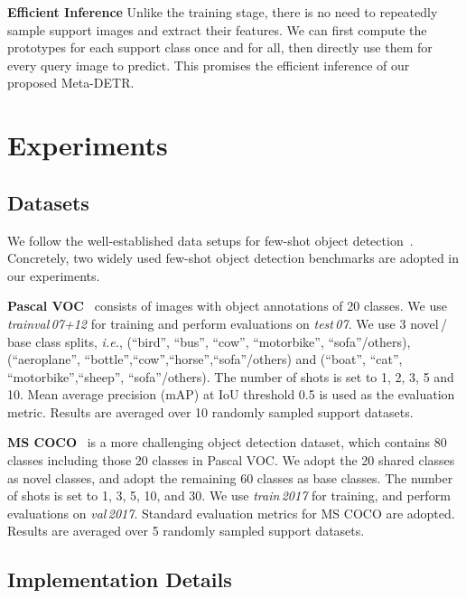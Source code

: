 \documentclass[letterpaper]{article} \usepackage{aaai22}  \usepackage{times}  \usepackage{helvet}  \usepackage{courier}  \usepackage[hyphens]{url}  \usepackage{graphicx} \urlstyle{rm} \def\UrlFont{\rm}  \usepackage{natbib}  \usepackage{caption} \DeclareCaptionStyle{ruled}{labelfont=normalfont,labelsep=colon,strut=off} \frenchspacing  \setlength{\pdfpagewidth}{8.5in}  \setlength{\pdfpageheight}{11in}  \usepackage{algorithm}
\begin{document}
\smallskip
\noindent\textbf{Efficient Inference\;\;}
Unlike the training stage, there is no need to repeatedly sample support images and extract their features. We can first compute the prototypes for each support class once and for all, then directly use them for every query image to predict. This promises the efficient inference of our proposed Meta-DETR.



\vspace{-1.50mm}
\section{Experiments}

\subsection{Datasets}

We follow the well-established data setups for few-shot object detection~\cite{FewshotReweighting,fsdet}. Concretely, two widely used few-shot object detection benchmarks are adopted in our experiments.

\smallskip
\noindent
\textbf{Pascal VOC}~\cite{PascalVOC}
consists of images with object annotations of 20 classes. We use \textit{trainval\,07+12} for training and perform evaluations on \textit{test\,07}. We use 3 novel\,/\,base class splits, \textit{i.e.}, (“bird”, “bus”, “cow”, “motorbike”, “sofa”\;/\;others), (“aeroplane”, “bottle”,“cow”,“horse”,“sofa”\;/\;others) and (“boat”, “cat”, “motorbike”,“sheep”, “sofa”\;/\;others). The number of shots is set to 1, 2, 3, 5 and 10.  Mean average precision (mAP) at IoU threshold 0.5 is used as the evaluation metric. Results are averaged over 10 randomly sampled support datasets. 




\smallskip
\vspace{+0.15mm}
\noindent
\textbf{MS COCO}~\cite{MSCOCO}
is a more challenging object detection dataset, which contains 80 classes including those 20 classes in Pascal VOC. We adopt the 20 shared classes as novel classes, and adopt the remaining 60 classes as base classes. The number of shots is set to 1, 3, 5, 10, and 30. We use \textit{train\,2017} for training, and perform evaluations on \textit{val\,2017}. Standard evaluation metrics for MS COCO are adopted. Results are averaged over 5 randomly sampled support datasets.




\subsection{Implementation Details} \label{sec:imple_details}
\end{document}
